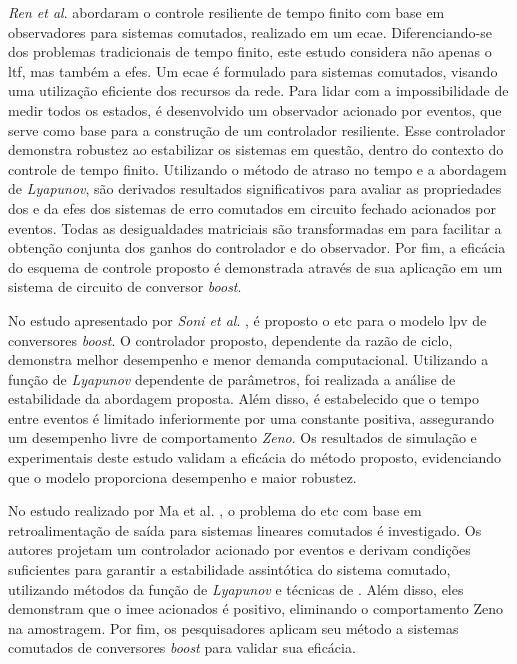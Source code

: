 \textit{Ren et al}. \cite{Ren2018} abordaram o controle resiliente de tempo finito com base em observadores para sistemas comutados, realizado em um \acrfull{ecae}. Diferenciando-se dos problemas tradicionais de tempo finito, este estudo considera não apenas o \acrfull{ltf}, mas também a \acrfull{efes}. Um \acrshort{ecae} é formulado para sistemas comutados, visando uma utilização eficiente dos recursos da rede. Para lidar com a impossibilidade de medir todos os estados, é desenvolvido um observador acionado por eventos, que serve como base para a construção de um controlador resiliente. Esse controlador demonstra robustez ao estabilizar os sistemas em questão, dentro do contexto do controle de tempo finito. Utilizando o método de atraso no tempo e a abordagem de \textit{Lyapunov}, são derivados resultados significativos para avaliar as propriedades dos  e da \acrshort{efes} dos sistemas de erro comutados em circuito fechado acionados por eventos. Todas as desigualdades matriciais são transformadas em  para facilitar a obtenção conjunta dos ganhos do controlador e do observador. Por fim, a eficácia do esquema de controle proposto é demonstrada através de sua aplicação em um sistema de circuito de conversor \textit{boost}.

No estudo apresentado por \textit{Soni et al}. \cite{Soni2023}, é proposto o \acrshort{etc} para o modelo \acrshort{lpv} de conversores \textit{boost}. O controlador proposto, dependente da razão de ciclo, demonstra melhor desempenho e menor demanda computacional. Utilizando a função de \textit{Lyapunov } dependente de parâmetros, foi realizada a análise de estabilidade da abordagem proposta. Além disso, é estabelecido que o tempo entre eventos é limitado inferiormente por uma constante positiva, assegurando um desempenho livre de comportamento \textit{Zeno}. Os resultados de simulação e experimentais deste estudo validam a eficácia do método proposto, evidenciando que o modelo proporciona desempenho e maior robustez.

No estudo realizado por Ma et al. \cite{Ma2016}, o problema do \acrshort{etc} com base em retroalimentação de saída para sistemas lineares comutados é investigado. Os autores projetam um controlador acionado por eventos e derivam condições suficientes para garantir a estabilidade assintótica do sistema comutado, utilizando métodos da função de \textit{Lyapunov} e técnicas de . Além disso, eles demonstram que o \acrshort{imee} acionados é positivo, eliminando o comportamento Zeno na amostragem. Por fim, os pesquisadores aplicam seu método a sistemas comutados de conversores \textit{boost} para validar sua eficácia.

